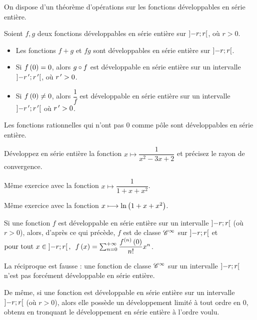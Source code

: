 On dispose d'un théorème d'opérations sur les fonctions développables en série entière.

\begin{theo}
Soient \(f,g\) deux fonctions développables en série entière sur \(\left]-r;r\right[\), où \(r>0\).

\begin{itemize}
    \item Les fonctions \(f+g\) et \(fg\) sont développables en série entière sur \(\left]-r;r\right[\). \\
    \item Si \(f\left(0\right)=0\), alors \(g\circ f\) est développable en série entière sur un intervalle \(\left]-r^{\,\prime};r^{\,\prime}\right[\), où \(r^{\,\prime}>0\). \\
    \item Si \(f\left(0\right)\not=0\), alors \(\dfrac{1}{f}\) est développable en série entière sur un intervalle \(\left]-r^{\,\prime};r^{\,\prime}\right[\) où \(r^{\,\prime}>0\).
\end{itemize}
\end{theo}

\begin{ex}
Les fonctions rationnelles qui n'ont pas \(0\) comme pôle sont développables en série entière.
\end{ex}

\begin{exo}
Développez en série entière la fonction \(x\mapsto\dfrac{1}{x^2-3x+2}\) et précisez le rayon de convergence.
\end{exo}

\begin{exo}
Même exercice avec la fonction \(x\mapsto\dfrac{1}{1+x+x^2}\).
\end{exo}

\begin{exo}
Même exercice avec la fonction \(x\longmapsto\ln\left(1+x+x^2\right)\).
\end{exo}

Si une fonction \(f\) est développable en série entière sur un intervalle \(\left]-r;r\right[\) (où \(r>0\)), alors, d'après ce qui précède, \(f\) est de classe \(\mathscr{C}^{\infty}\) sur \(\left]-r;r\right[\) et \(\quantifs{\tpt x\in\intervee{-r}{r}}f\paren{x}=\sum_{n=0}^{\pinf}\dfrac{f\deriv{n}\paren{0}}{n!}x^n\).

La réciproque est fausse : une fonction de classe \(\mathscr{C}^{\infty}\) sur un intervalle \(\left]-r;r\right[\) n'est pas forcément développable en série entière.

De même, si une fonction est développable en série entière sur un intervalle \(\left]-r;r\right[\) (où \(r>0\)), alors elle possède un développement limité à tout ordre en \(0\), obtenu en tronquant le développement en série entière à l'ordre voulu.

